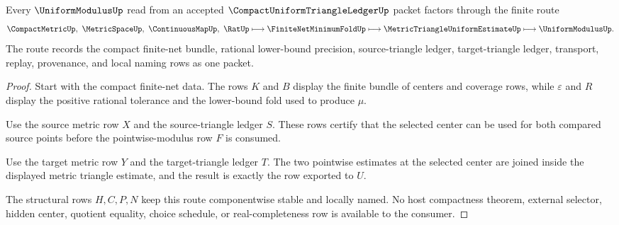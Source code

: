 \begin{theorem}
\label{thm:compact-uniform-triangle-ledger-handoff}
Every $\UniformModulusUp$ read from an accepted $\CompactUniformTriangleLedgerUp$ packet factors through the finite route
$$
\CompactMetricUp,\ \MetricSpaceUp,\ \ContinuousMapUp,\ \RatUp
\longmapsto
\FiniteNetMinimumFoldUp
\longmapsto
\MetricTriangleUniformEstimateUp
\longmapsto
\UniformModulusUp .
$$
The route records the compact finite-net bundle, rational lower-bound precision, source-triangle ledger, target-triangle ledger, transport, replay, provenance, and local naming rows as one packet.
\end{theorem}
\begin{proof}
Start with the compact finite-net data. The rows $K$ and $B$ display the finite bundle of centers and coverage rows, while $\varepsilon$ and $R$ display the positive rational tolerance and the lower-bound fold used to produce $\mu$.

Use the source metric row $X$ and the source-triangle ledger $S$. These rows certify that the selected center can be used for both compared source points before the pointwise-modulus row $F$ is consumed.

Use the target metric row $Y$ and the target-triangle ledger $T$. The two pointwise estimates at the selected center are joined inside the displayed metric triangle estimate, and the result is exactly the row exported to $U$.

The structural rows $H,C,P,N$ keep this route componentwise stable and locally named. No host compactness theorem, external selector, hidden center, quotient equality, choice schedule, or real-completeness row is available to the consumer.
\end{proof}


